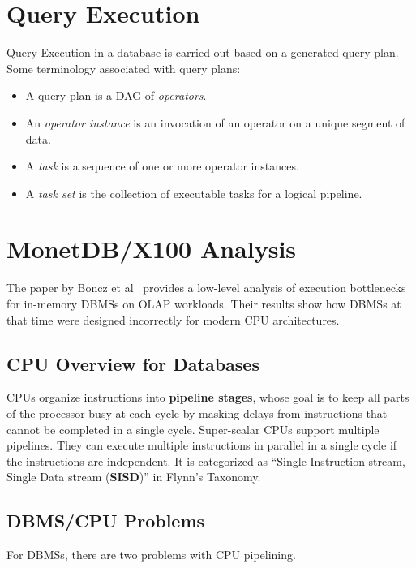 \documentclass[11pt]{article}
\begin{document}
\section{Query Execution}
Query Execution in a database is carried out based on a generated query plan. Some terminology associated with query plans:
\begin{itemize}
    \item A query plan is a DAG of \textit{operators}.
    \item An \textit{operator instance} is an invocation of an operator on a unique segment of data. 
    \item A \textit{task} is a sequence of one or more operator instances. 
    \item A \textit{task set} is the collection of executable tasks for a logical pipeline.
\end{itemize}
\section{MonetDB/X100 Analysis}
The paper by Boncz et al~\cite{Boncz2005} provides a low-level analysis of execution  
bottlenecks for in-memory DBMSs on OLAP workloads. Their results show how DBMSs at that time were 
designed incorrectly for modern CPU architectures.

\subsection{CPU Overview for Databases}
CPUs organize instructions into \textbf{pipeline stages}, whose goal is to keep all parts of the 
processor busy at each cycle by masking delays from instructions that cannot be completed in a single 
cycle. Super-scalar CPUs support multiple pipelines. They can execute multiple instructions in 
parallel in a single cycle if the instructions are independent. It is categorized as ``Single 
Instruction stream, Single Data stream (\textbf{SISD})'' in Flynn's Taxonomy.

\subsection{DBMS/CPU Problems}
For DBMSs, there are two problems with CPU pipelining. 
\end{document}
